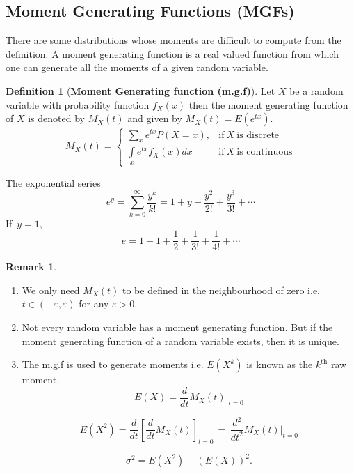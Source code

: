 \documentclass[12pt,a4paper]{report}
\theoremstyle{definition}
\newtheorem{definition}[thm]{Definition}
\newtheorem{remark}[thm]{Remark}
\theoremstyle{plain}
\theoremstyle{definition}
\begin{document}
\subsection{Moment Generating Functions (MGFs)}
There are some distributions whose moments are difficult to compute from the definition. A moment generating function is a real valued function from which one can generate all the moments of a given random variable. 



\begin{definition}[\textbf{Moment Generating function (m.g.f)}]
Let $X$ be a random variable with probability function $f_X(x)$ then the moment generating function of $X$ is denoted by $M_X(t)$ and given by $M_X(t)=E(e^{tx})$.
\[ M_X(t)=
\begin{cases}
\sum\limits_xe^{tx}P(X=x),&\text{if}\  X\  \text{is discrete}\\[1ex]
\int\limits_xe^{tx}f_X(x)dx &\text{if}\ X\  \text{is continuous}
\end{cases}
\]
\end{definition}

The exponential series
\[e^y  =\sum^{\infty}_{k=0}\frac{y^k}{k!} =1+y+\frac{y^2}{2!}+\frac{y^3}{3!}+\cdots\]
If $\, y = 1$, 
\[e=1+1+\frac{1}{2}+\frac{1}{3!}+\frac{1}{4!}+\cdots\]




\begin{remark}
\begin{enumerate}
\item[(a).] We only need $M_X(t)$ to be defined in the neighbourhood of zero  i.e. $t\in (-\varepsilon,\varepsilon)$ for any $\varepsilon >0$.
\item[(b).] Not every random variable has a moment generating function. But if the moment generating function of a random variable exists, then it is unique.
\item[(c).] The m.g.f is used to generate moments i.e. $E(X^k)$ is known as the $k^{\text{th}}$ raw moment.
\[E(X)  =\frac{d}{dt}M_X(t)\Bigg|_{t=0}\]

\[E(X^2) =\frac{d}{dt}\left[\frac{d}{dt}M_X(t)\right]_{t=0} \, =\, \frac{d^2}{dt^2}M_X(t)\Bigg|_{t=0}\]

\[\sigma^2  =E(X^2)-(E(X))^2.\]
\end{enumerate}
\end{remark}
\end{document}

